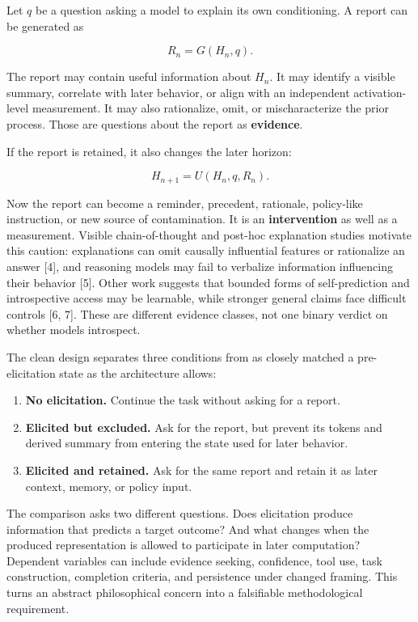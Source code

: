 \documentclass[12pt]{article}
\providecommand{\tightlist}{%
  \setlength{\itemsep}{0pt}\setlength{\parskip}{0pt}}
\begin{document}
Let \(q\) be a question asking a model to explain its own conditioning. A report can be generated as

\[
R_n = G(H_n, q).
\]

The report may contain useful information about \(H_n\). It may identify a visible summary, correlate with later behavior, or align with an independent activation-level measurement. It may also rationalize, omit, or mischaracterize the prior process. Those are questions about the report as \textbf{evidence}.

If the report is retained, it also changes the later horizon:

\[
H_{n+1} = U(H_n, q, R_n).
\]

Now the report can become a reminder, precedent, rationale, policy-like instruction, or new source of contamination. It is an \textbf{intervention} as well as a measurement. Visible chain-of-thought and post-hoc explanation studies motivate this caution: explanations can omit causally influential features or rationalize an answer {[}4{]}, and reasoning models may fail to verbalize information influencing their behavior {[}5{]}. Other work suggests that bounded forms of self-prediction and introspective access may be learnable, while stronger general claims face difficult controls {[}6, 7{]}. These are different evidence classes, not one binary verdict on whether models introspect.

The clean design separates three conditions from as closely matched a pre-elicitation state as the architecture allows:

\begin{enumerate}
\def\labelenumi{\arabic{enumi}.}
\tightlist
\item
  \textbf{No elicitation.} Continue the task without asking for a report.
\item
  \textbf{Elicited but excluded.} Ask for the report, but prevent its tokens and derived summary from entering the state used for later behavior.
\item
  \textbf{Elicited and retained.} Ask for the same report and retain it as later context, memory, or policy input.
\end{enumerate}

The comparison asks two different questions. Does elicitation produce information that predicts a target outcome? And what changes when the produced representation is allowed to participate in later computation? Dependent variables can include evidence seeking, confidence, tool use, task construction, completion criteria, and persistence under changed framing. This turns an abstract philosophical concern into a falsifiable methodological requirement.
\end{document}

